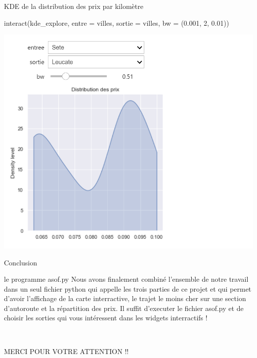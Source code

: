 \documentclass[aspectratio=169]{beamer}
\begin{document}
\begin{frame}{KDE de la distribution des prix par kilomètre}
\begin{block}{}
 interact(kde\_explore, entre = villes, sortie = villes, bw = (0.001, 2, 0.01))\\[2 mm]
\end{block}
\begin{center}
 \includegraphics[scale=0.55]{KDE1.png}
\end{center}

\end{frame}

\begin{frame}{Conclusion}
    \begin{block}{le programme asof.py}
    Nous avons finalement combiné l'ensemble de notre travail dans un seul fichier python qui appelle les trois parties de ce projet et qui permet d'avoir l'affichage de la carte interractive, le trajet le moins cher sur une section d'autoroute et la répartition des prix. Il suffit d'executer le fichier asof.py et de choisir les sorties qui vous intéressent dans les widgets interractifs !
    
    \end{block}
    
    
    
\end{frame}





\begin{frame}{}

 \begin{block}{}
  $ \;\;\;\; \; $ \\
  \begin{center}
      MERCI POUR VOTRE ATTENTION !! \\
  \end{center}
   
   $\;\;\;$ \\
 \end{block}
    
\end{frame}
\end{document}
